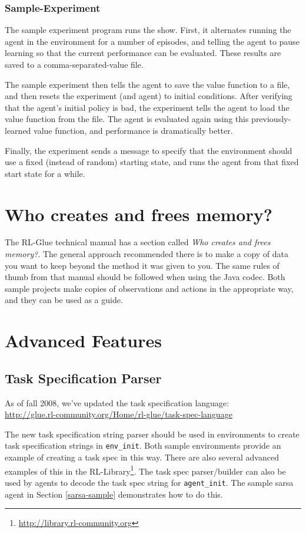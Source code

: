 \documentclass[11pt]{article}
\begin{document}
\subsubsection{Sample-Experiment}
The sample experiment program runs the show.  First, it alternates running the agent in the environment for a number of episodes, and telling the agent to pause learning so that the current performance can be evaluated.  These results are saved to a comma-separated-value file.

The sample experiment then tells the agent to save the value function to a file, and then resets the experiment (and agent) to initial conditions.  After verifying that the agent's initial policy is bad, the experiment tells the agent to load the value function from the file.  The agent is evaluated again using this previously-learned value function, and performance is dramatically better.

Finally, the experiment sends a message to specify that the environment should use a fixed (instead of random) starting state, and runs the agent from that fixed start state for a while.


\section{Who creates and frees memory?}
The RL-Glue technical manual has a section called \textit{Who creates and frees memory?}.  The general approach recommended there is to make a copy of data
you want to keep beyond the method it was given to you.  The same rules of thumb from that manual should be followed when using the Java codec.  Both sample projects make copies of observations and actions in the appropriate way, and they can be used as a guide.


\section{Advanced Features}
\subsection{Task Specification Parser}
As of fall 2008, we've updated the task specification language:\\
\url{http://glue.rl-community.org/Home/rl-glue/task-spec-language}

The new task specification string parser should be used in environments to create task specification strings in \texttt{env\_init}.  Both sample environments provide an example of creating a task spec in this way.  There are also several advanced examples of this in the RL-Library\footnote{\url{http://library.rl-community.org}}.  The task spec parser/builder can also be used by agents to decode the task spec string for \texttt{agent\_init}.  The sample sarsa agent in Section \ref{sarsa-sample} demonstrates how to do this.
\end{document}
